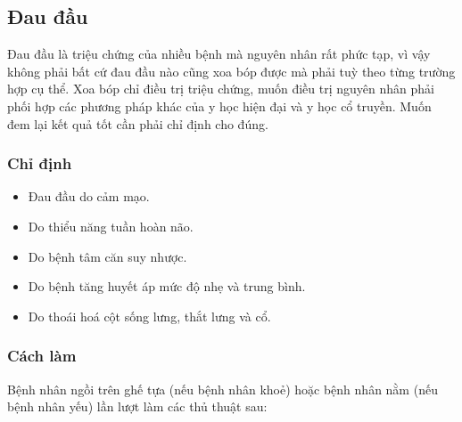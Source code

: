 
\subsection{Đau đầu}

Đau đầu là triệu chứng của nhiều bệnh mà nguyên nhân rất phức tạp,
vì vậy không phải bất cứ đau đầu nào cũng xoa bóp được mà phải tuỳ
theo từng trường hợp cụ thể. Xoa bóp chỉ điều trị triệu chứng,
muốn điều trị nguyên nhân phải phối hợp các phương pháp khác của y
học hiện đại và y học cổ truyền. Muốn đem lại kết quả tốt cần phải
chỉ định cho đúng.

\subsubsection{Chỉ định}
\begin{itemize}
    \item Đau đầu do cảm mạo.
    \item Do thiểu năng tuần hoàn não.
    \item Do bệnh tâm căn suy nhược.
    \item Do bệnh tăng huyết áp mức độ nhẹ và trung bình.
    \item Do thoái hoá cột sống lưng, thắt lưng và cổ.
\end{itemize}

\subsubsection{Cách làm}
Bệnh nhân ngồi trên ghế tựa (nếu bệnh nhân khoẻ) hoặc bệnh nhân nằm
(nếu bệnh nhân yếu) lần lượt làm các thủ thuật sau:

